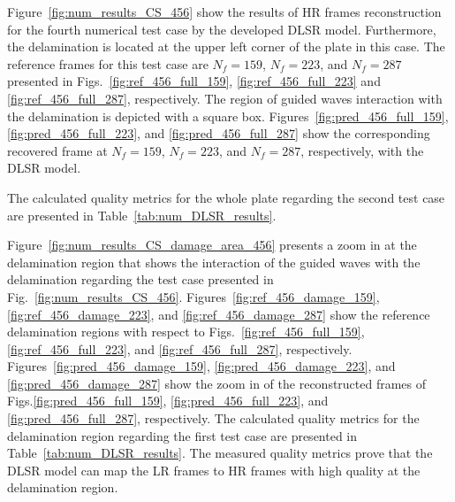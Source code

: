 Figure~\ref{fig:num_results_CS_456} show the results of HR frames reconstruction for the fourth numerical test case by the developed DLSR model.
Furthermore, the delamination is located at the upper left corner of the plate in this case.
The reference frames for this test case are $N_f=159$, $N_f=223$, and $N_f=287$ presented in Figs.~\ref{fig:ref_456_full_159}, \ref{fig:ref_456_full_223} and \ref{fig:ref_456_full_287}, respectively.
The region of guided waves interaction with the delamination is depicted with a square box.
Figures~\ref{fig:pred_456_full_159}, \ref{fig:pred_456_full_223}, and \ref{fig:pred_456_full_287} show the corresponding recovered frame at $N_f=159$, $N_f=223$, and $N_f=287$, respectively, with the DLSR model.

The calculated quality metrics for the whole plate regarding the second test case are presented in Table~\ref{tab:num_DLSR_results}.

Figure~\ref{fig:num_results_CS_damage_area_456} presents a zoom in at the delamination region that shows the interaction of the guided waves with the delamination regarding the test case presented in Fig.~\ref{fig:num_results_CS_456}.
Figures~\ref{fig:ref_456_damage_159}, \ref{fig:ref_456_damage_223}, and \ref{fig:ref_456_damage_287} show the reference delamination regions with respect to Figs.~\ref{fig:ref_456_full_159}, \ref{fig:ref_456_full_223}, and \ref{fig:ref_456_full_287}, respectively.
Figures~\ref{fig:pred_456_damage_159}, \ref{fig:pred_456_damage_223}, and \ref{fig:pred_456_damage_287} show the zoom in of the reconstructed frames of Figs.\ref{fig:pred_456_full_159}, \ref{fig:pred_456_full_223}, and \ref{fig:pred_456_full_287}, respectively.
The calculated quality metrics for the delamination region regarding the first test case are presented in Table~\ref{tab:num_DLSR_results}.
The measured quality metrics prove that the DLSR model can map the LR frames to HR frames with high quality at the delamination region.

